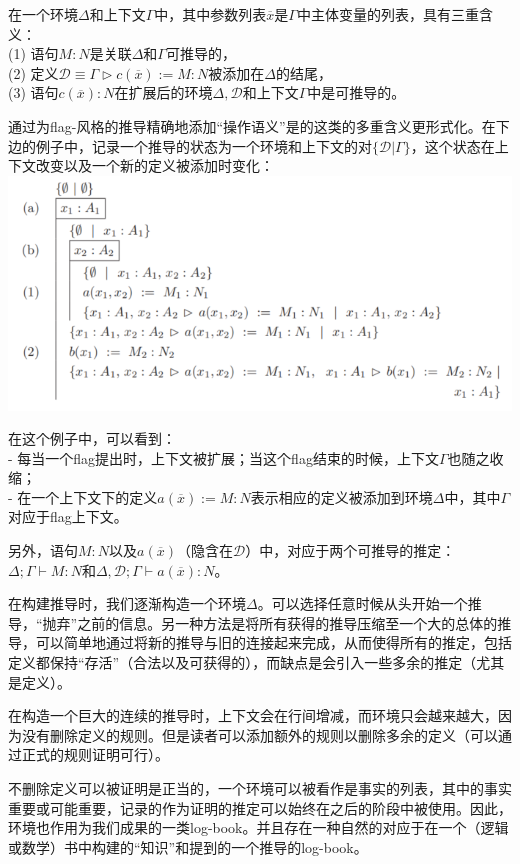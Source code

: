 \documentclass[UTF8]{article}
\begin{document}
	\noindent
	在一个环境$\Delta$和上下文$\Gamma$中，其中参数列表$\overline{x}$是$\Gamma$中主体变量的列表，具有三重含义：\\
	(1) 语句$M:N$是关联$\Delta$和$\Gamma$可推导的，\\
	(2) 定义$\mathcal{D}\equiv\Gamma\triangleright c(\overline{x}):=M:N$被添加在$\Delta$的结尾，\\
	(3) 语句$c(\overline{x}):N$在扩展后的环境$\Delta,\mathcal{D}$和上下文$\Gamma$中是可推导的。
	
		通过为flag-风格的推导精确地添加“操作语义”是的这类的多重含义更形式化。在下边的例子中，记录一个推导的状态为一个环境和上下文的对$\lbrace\mathcal{D}|\Gamma\rbrace$，这个状态在上下文改变以及一个新的定义被添加时变化：\\
		\includegraphics[width=0.93\linewidth]{"../imgs/11-4.png"}
	
		在这个例子中，可以看到：\\
	- 每当一个flag提出时，上下文被扩展；当这个flag结束的时候，上下文$\Gamma$也随之收缩；\\
	- 在一个上下文下的定义$a(\overline{x}):=M:N$表示相应的定义被添加到环境$\Delta$中，其中$\Gamma$对应于flag上下文。
	
		另外，语句$M:N$以及$a(\overline{x})$（隐含在$\mathcal{D}$）中，对应于两个可推导的推定：$\Delta;\Gamma\vdash M:N$和$\Delta,\mathcal{D};\Gamma\vdash a(\overline{x}):N$。
		
		在构建推导时，我们逐渐构造一个环境$\Delta$。可以选择任意时候从头开始一个推导，“抛弃”之前的信息。另一种方法是将所有获得的推导压缩至一个大的总体的推导，可以简单地通过将新的推导与旧的连接起来完成，从而使得所有的推定，包括定义都保持“存活”（合法以及可获得的），而缺点是会引入一些多余的推定（尤其是定义）。
		
		在构造一个巨大的连续的推导时，上下文会在行间增减，而环境只会越来越大，因为没有删除定义的规则。但是读者可以添加额外的规则以删除多余的定义（可以通过正式的规则证明可行）。
		
		不删除定义可以被证明是正当的，一个环境可以被看作是事实的列表，其中的事实重要或可能重要，记录的作为证明的推定可以始终在之后的阶段中被使用。因此，环境也作用为我们成果的一类log-book。并且存在一种自然的对应于在一个（逻辑或数学）书中构建的“知识”和提到的一个推导的log-book。
		
\end{document}
